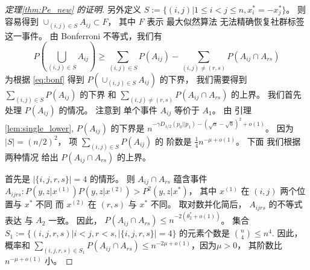 \begin{proof}[定理\ref{thm:Pe_new} 的证明]
另外定义 $S:=\{(i,j)| 1\leq i < j\leq n,
x_i^*=-x_j^*
\}$。
则容易得到 $\cup_{(i,j) \in S} A_{ij} \subset F$，
其中 $F$ 表示 最大似然算法 无法精确恢复社群标签
这一事件。
由 Bonferroni 不等式，我们有
\begin{equation}\label{eq:bonf}
	P(\bigcup_{(i,j)\in S} A_{ij}) \geq
	\sum_{(i,j)\in S} P(A_{ij})
	- \sum_{(i,j) \neq (r,s)} P(A_{ij} \cap A_{rs})		
\end{equation}
为根据 \eqref{eq:bonf}
得到
$P(\cup_{(i,j)\in S} A_{ij})$
的下界，
我们需要得到 $\sum_{(i,j)\in S} P(A_{ij})$
的下界 和
$\sum_{(i,j) \neq (r,s)} P(A_{ij} \cap A_{rs})$
的上界。
我们首先 处理 $P(A_{ij})$ 的情况。
注意到 单个事件 $A_{ij}$
等价于 $A_1$。
由 引理 \ref{lem:single_lower},
$P(A_{ij})$ 的下界是
$n^{-\gamma D_{1/2}(p_0 || p_1)-(\sqrt{a} - \sqrt{b})^2 +o(1)}$。
因为
$|S|=(n/2)^2$，
项 $\sum_{(i,j) \in S} P(A_{ij})$ 的 阶数是 
$\frac{1}{4}n^{-\mu+o(1)}$。
下面 我们根据两种情况 给出 $P(A_{ij} \cap A_{rs})$ 的上界。

首先是  $|\{i,j,r,s\}|=4$
的情形。 则 $A_{ij} \cap A_{rs}$ 蕴含事件
$A_{ijrs}: P(y,z|x^{(1)})P(y,z|x^{(2)}) > P^2(y,z|x^*)$，
其中 $x^{(1)}$ 在 $(i,j)$ 两个位置与 $x^*$ 不同
而 $x^{(2)}$ 在 $(r,s)$ 与 $x^*$
不同。
取对数并化简后，
$A_{ijrs}$ 的不等式表达
与 $A_2$ 一致。
因此， $P(A_{ij} \cap A_{rs}) \leq n^{-2(\theta^*_2 + o(1))} $。
集合 $S_1:=\{(i,j,r,s)| i<j, r<s, |\{i,j,r,s\}|=4\}$
的元素个数是 $\binom{n}{4} \leq n^4$.
因此，概率和
$\sum_{(i,j,r,s) \in S_1} P(A_{ij} \cap A_{rs})
\leq n^{-2\mu +o(1)}$，因为$\mu > 0$，
其阶数比 $n^{-\mu+o(1)}$ 小。


\end{proof}

